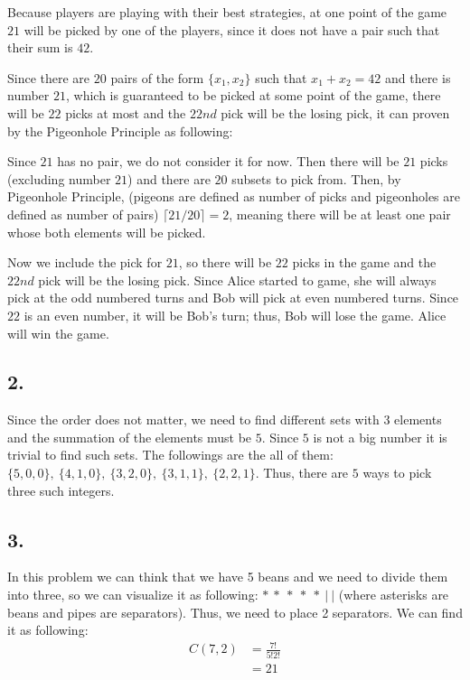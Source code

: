 \documentclass[12pt]{article}
\begin{document}
\qquad Because players are playing with their best strategies, at one point of the game $21$ will be picked by one of the players, since it does not have a pair such that their sum is $42$.

\qquad Since there are $20$ pairs of the form $\{x_1, x_2\}$ such that $x_1 + x_2 = 42$ and there is number $21$, which is guaranteed to be picked at some point of the game, there will be $22$ picks at most and the $22nd$ pick will be the losing pick, it can proven by the Pigeonhole Principle as following:

\qquad Since $21$ has no pair, we do not consider it for now. Then there will be $21$ picks (excluding number $21$) and there are $20$ subsets to pick from. Then, by Pigeonhole Principle, (pigeons are defined as number of picks and pigeonholes are defined as number of pairs) $\lceil21/20\rceil = 2$, meaning there will be at least one pair whose both elements will be picked.

\qquad Now we include the pick for $21$, so there will be $22$ picks in the game and the $22nd$ pick will be the losing pick. Since Alice started to game, she will always pick at the odd numbered turns and Bob will pick at even numbered turns. Since $22$ is an even number, it will be Bob's turn; thus, Bob will lose the game. Alice will win the game.

\subsection*{2.}

\qquad Since the order does not matter, we need to find different sets with 3 elements and the summation of the elements must be $5$. Since $5$ is not a big number it is trivial to find such sets. The followings are the all of them: $\{5, 0, 0\}, \ \{4, 1, 0\}, \ \{3, 2, 0\}, \ \{3, 1, 1\}, \ \{2, 2, 1\}$. Thus, there are $5$ ways to pick three such integers.

\subsection*{3.}

\qquad In this problem we can think that we have 5 beans and we need to divide them into three, so we can visualize it as following: $* \ * \ * \ * \ * \ | \ |$ (where asterisks are beans and pipes are separators). Thus, we need to place 2 separators. We can find it as following:
        \begin{equation} 
        \label{eq1}
        \begin{split}
            C(7, 2) & = \frac{7!}{5!2!} \\
            & = 21
        \end{split}
        \end{equation}
        
\end{document}
